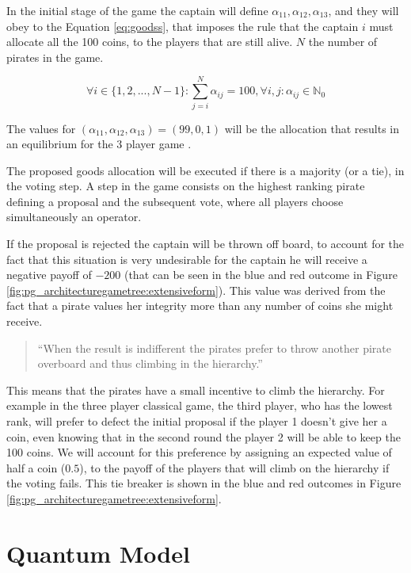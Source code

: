 \documentclass{llncs} %
\begin{document}
In the initial stage of the game the captain will define $\alpha_{11}, \alpha_{12}, \alpha_{13}$, and they will obey to the Equation \ref{eq:goodss}, that imposes the rule that the captain $i$ must allocate all the 100 coins, to the players that are still alive. $N$ the number of pirates in the game. 

\begin{equation}
\label{eq:goodss}
\forall i \in \{1 , 2, ..., N-1\} : \sum_{j=i}^{N}\alpha_{ij}=100, \forall i,j :\alpha_{ij}\in\mathbb{N}_{0}
\end{equation}

The values for $(\alpha_{11}, \alpha_{12}, \alpha_{13})=(99, 0, 1)$ will be the allocation that results in an equilibrium for the $3$ player game .

The proposed goods allocation will be executed if there is a majority (or a tie), in the voting step. A step in the game consists on the highest ranking pirate defining a proposal and the subsequent vote, where all players choose simultaneously an operator. 

If the proposal is rejected the captain will be thrown off board, to account for the fact that this situation is very undesirable for the captain he will receive a negative payoff of $-200$ (that can be seen in the blue and red outcome in Figure \ref{fig:pg_architecturegametree:extensiveform}). This value was derived from the fact that a pirate values her integrity more than any number of coins she might receive.


\begin{quotation}
``When the result is indifferent the pirates prefer to throw another pirate overboard and thus climbing in the hierarchy.''
\end{quotation}

This means that the pirates have a small incentive to climb the hierarchy. For example in the three player classical game, the third player, who has the lowest rank, will prefer to defect the initial proposal if the player 1 doesn't give her a coin, even knowing that in the second round the player 2 will be able to keep the 100 coins. We will account for this preference by assigning an expected value of half a coin ($0.5$), to the payoff of the players that will climb on the hierarchy if the voting fails. This tie breaker is shown in the blue and red outcomes in Figure \ref{fig:pg_architecturegametree:extensiveform}.

\section{Quantum Model}
\end{document}
